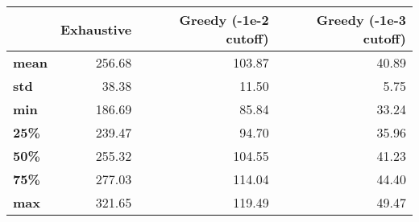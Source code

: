 \begin{tabular}{lrrr}
\toprule
{} &  Exhaustive &  Greedy (-1e-2 cutoff) &  Greedy (-1e-3 cutoff) \\
\midrule
\textbf{mean} &      256.68 &                 103.87 &                  40.89 \\
\textbf{std } &       38.38 &                  11.50 &                   5.75 \\
\textbf{min } &      186.69 &                  85.84 &                  33.24 \\
\textbf{25\% } &      239.47 &                  94.70 &                  35.96 \\
\textbf{50\% } &      255.32 &                 104.55 &                  41.23 \\
\textbf{75\% } &      277.03 &                 114.04 &                  44.40 \\
\textbf{max } &      321.65 &                 119.49 &                  49.47 \\
\bottomrule
\end{tabular}

